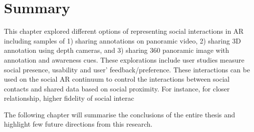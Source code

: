 \section{Summary}

This chapter explored different options of representing social interactions in AR including samples of 1) sharing annotations on panoramic video, 2) sharing 3D annotation using depth cameras, and 3) sharing 360 panoramic image with annotation and awareness cues. These explorations include user studies measure social presence, usability and user' feedback/preference. These interactions can be used on the social AR continuum to control the interactions between social contacts and shared data based on social proximity. For instance, for closer relationship, higher fidelity of social interac

The following chapter will summarise the conclusions of the entire thesis and highlight few future directions from this research.
